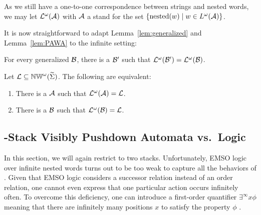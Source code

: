 \documentclass{LMCS}
\begin{document}
 As we still have a one-to-one correspondence between strings and nested
 words, we may let $\mathcal{L}^\omega(\mathcal{A})$ with $\mathcal{A}$ a \Buchi \MVPA stand for the
 set $\{\mathrm{nested}(w) \mid w \in L^\omega(\mathcal{A})\}$.

 It is now straightforward to adapt Lemma~\ref{lem:generalized} and
 Lemma~\ref{lem:PAWA} to the infinite setting:

\begin{lem}\label{lem:Bgen}
  For every generalized \Buchi \MNWA $\mathcal{B}$, there is a \Buchi \MNWA $\mathcal{B}'$
  such that $\mathcal{L}^\omega(\mathcal{B}') = \mathcal{L}^\omega(\mathcal{B})$.
\end{lem}

\begin{lem}\label{lem:BPAWA}
  Let $\mathcal{L} \subseteq \mathbb{NW}^\omega(\widetilde{\Sigma})$. The following are equivalent:
\begin{enumerate}[\em(1)]
\item There is a \Buchi \MVPA $\mathcal{A}$ such that $\mathcal{L}^\omega(\mathcal{A}) = \mathcal{L}$.
\item There is a \Buchi \MNWA $\mathcal{B}$ such that $\mathcal{L}^\omega(\mathcal{B}) = \mathcal{L}$.
\end{enumerate}
\end{lem}

\subsection{-Stack Visibly Pushdown Automata vs.\ Logic}

In this section, we will again restrict to two stacks. Unfortunately, EMSO
logic over infinite nested words turns out to be too weak to capture all the
behaviors of \Buchi \tVPA. Given that EMSO logic considers a successor
relation instead of an order relation, one cannot even express that one
particular action occurs infinitely often. To overcome this deficiency, one
can introduce a first-order quantifier $\exists^\infty x \phi$ meaning that
there are infinitely many positions $x$ to satisfy the property $\phi$
\cite{LSV:06:11}.
\end{document}
